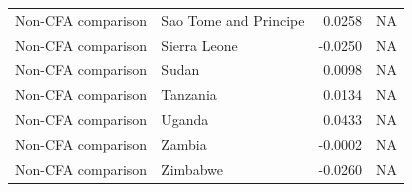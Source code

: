 \begin{table}
\begin{tabular}[t]{llrr}
Non-CFA comparison & Sao Tome and Principe & 0.0258 & NA\\
Non-CFA comparison & Sierra Leone & -0.0250 & NA\\
\addlinespace
Non-CFA comparison & Sudan & 0.0098 & NA\\
Non-CFA comparison & Tanzania & 0.0134 & NA\\
Non-CFA comparison & Uganda & 0.0433 & NA\\
Non-CFA comparison & Zambia & -0.0002 & NA\\
Non-CFA comparison & Zimbabwe & -0.0260 & NA\\
\bottomrule
\end{tabular}
\end{table}
